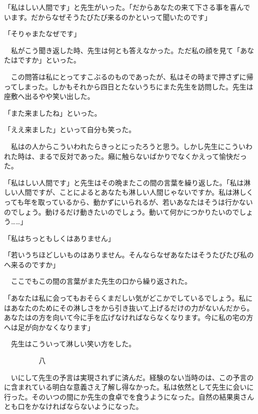 \documentclass[a4j,onecolumn]{tarticle}
\begin{document}
「私はしい人間です」と先生がいった。\hbox{}「だからあなたの来て下さる事を喜んでいます。\hbox{}だからなぜそうたびたび来るのかといって聞いたのです」\par{}
「そりゃまたなぜです」\par{}
　私がこう聞き返した時、\hbox{}先生は何とも答えなかった。\hbox{}ただ私の顔を見て「あなたはですか」といった。\hbox{}\par{}
　この問答は私にとってすこぶるのものであったが、\hbox{}私はその時まで押さずに帰ってしまった。\hbox{}しかもそれから四日とたないうちにまた先生を訪問した。\hbox{}先生は座敷へ出るやや笑い出した。\hbox{}\par{}
「また来ましたね」といった。\hbox{}\par{}
「ええ来ました」といって自分も笑った。\hbox{}\par{}
　私はの人からこういわれたらきっとにったろうと思う。\hbox{}しかし先生にこういわれた時は、\hbox{}まるで反対であった。\hbox{}癪に触らないばかりでなくかえって愉快だった。\hbox{}\par{}
「私はしい人間です」と先生はその晩またこの間の言葉を繰り返した。\hbox{}「私は淋しい人間ですが、\hbox{}ことによるとあなたも淋しい人間じゃないですか。\hbox{}私は淋しくっても年を取っているから、\hbox{}動かずにいられるが、\hbox{}若いあなたはそうは行かないのでしょう。\hbox{}動けるだけ動きたいのでしょう。\hbox{}動いて何かにつかりたいのでしょう……」\par{}
「私はちっともしくはありません」\par{}
「若いうちほどしいものはありません。\hbox{}そんならなぜあなたはそうたびたび私のへ来るのですか」\par{}
　ここでもこの間の言葉がまた先生の口から繰り返された。\hbox{}\par{}
「あなたは私に会ってもおそらくまだしい気がどこかでしているでしょう。\hbox{}私にはあなたのためにその淋しさをから引き抜いて上げるだけの力がないんだから。\hbox{}あなたはの方を向いて今に手を広げなければならなくなります。\hbox{}今に私の宅の方へは足が向かなくなります」\par{}
　先生はこういって淋しい笑い方をした。\hbox{}\par{}\par{}　　　　　八
\par{}
　いにして先生の予言は実現されずに済んだ。\hbox{}経験のない当時のは、\hbox{}この予言のに含まれている明白な意義さえ了解し得なかった。\hbox{}私は依然として先生に会いに行った。\hbox{}そのいつの間にか先生の食卓でを食うようになった。\hbox{}自然の結果奥さんとも口をかなければならないようになった。\hbox{}\par{}
\end{document}
